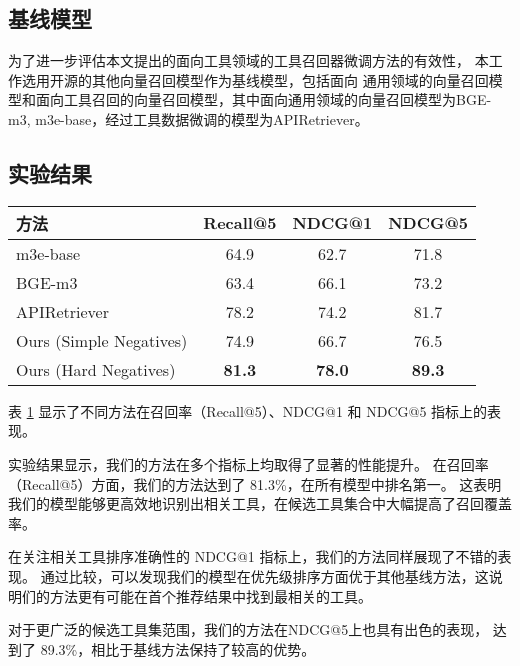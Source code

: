 \subsection{基线模型}

为了进一步评估本文提出的面向工具领域的工具召回器微调方法的有效性，
本工作选用开源的其他向量召回模型作为基线模型，包括面向
通用领域的向量召回模型和面向工具召回的向量召回模型，其中面向通用领域的向量召回模型为BGE-m3\cite{chen2024bge}, m3e-base\cite{moka2024m3e}，经过工具数据微调的模型为APIRetriever\cite{Qin2023}。

\subsection{实验结果}

\begin{table}[H]
  \centering
  \label{tab:comparison}
  \begin{tabular}{l|c|c|c}
    \toprule
    \textbf{方法} & \textbf{Recall@5} & \textbf{NDCG@1} & \textbf{NDCG@5} \\
    \midrule
    m3e-base                  & 64.9 & 62.7 & 71.8 \\
    BGE-m3                    & 63.4 & 66.1 & 73.2 \\
    APIRetriever              & 78.2 & 74.2 & 81.7 \\
    Ours (Simple Negatives)   & 74.9 & 66.7 & 76.5 \\
    Ours (Hard Negatives)     & \textbf{81.3} & \textbf{78.0} & \textbf{89.3} \\ 
    \bottomrule
  \end{tabular}
\end{table}

表 \ref{tab:comparison} 显示了不同方法在召回率（Recall@5）、NDCG@1 和 NDCG@5 指标上的表现。

实验结果显示，我们的方法在多个指标上均取得了显著的性能提升。
在召回率（Recall@5）方面，我们的方法达到了 81.3\%，在所有模型中排名第一。
这表明我们的模型能够更高效地识别出相关工具，在候选工具集合中大幅提高了召回覆盖率。

在关注相关工具排序准确性的 NDCG@1 指标上，我们的方法同样展现了不错的表现。
通过比较，可以发现我们的模型在优先级排序方面优于其他基线方法，这说明们的方法更有可能在首个推荐结果中找到最相关的工具。

对于更广泛的候选工具集范围，我们的方法在NDCG@5上也具有出色的表现，
达到了 89.3\%，相比于基线方法保持了较高的优势。

